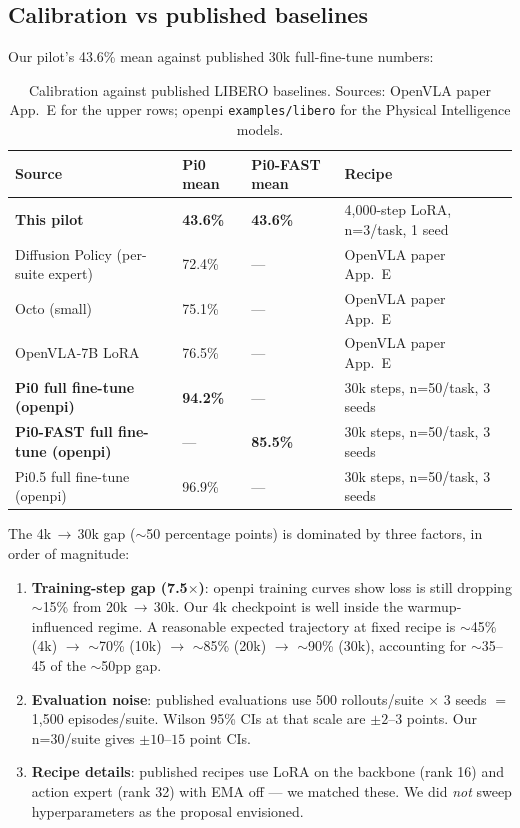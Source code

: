 \documentclass[11pt,letterpaper]{article}
\begin{document}
\subsection{Calibration vs published baselines}

Our pilot's 43.6\% mean against published 30k full-fine-tune numbers:

\begin{table}[h]
\centering
\small
\caption{Calibration against published LIBERO baselines. Sources: OpenVLA paper App.~E for the upper rows; openpi \texttt{examples/libero} for the Physical Intelligence models.}
\begin{tabularx}{\textwidth}{Xllll}
\toprule
\textbf{Source} & \textbf{Pi0 mean} & \textbf{Pi0-FAST mean} & \textbf{Recipe} \\
\midrule
\textbf{This pilot} & \textbf{43.6\%} & \textbf{43.6\%} & 4{,}000-step LoRA, n=3/task, 1 seed \\
Diffusion Policy (per-suite expert) & 72.4\% & --- & OpenVLA paper App.~E \\
Octo (small) & 75.1\% & --- & OpenVLA paper App.~E \\
OpenVLA-7B LoRA & 76.5\% & --- & OpenVLA paper App.~E \\
\textbf{Pi0 full fine-tune (openpi)} & \textbf{94.2\%} & --- & 30k steps, n=50/task, 3 seeds \\
\textbf{Pi0-FAST full fine-tune (openpi)} & --- & \textbf{85.5\%} & 30k steps, n=50/task, 3 seeds \\
Pi0.5 full fine-tune (openpi) & 96.9\% & --- & 30k steps, n=50/task, 3 seeds \\
\bottomrule
\end{tabularx}
\end{table}

The 4k\,$\to$\,30k gap ($\sim$50 percentage points) is dominated by three factors, in order of magnitude:

\begin{enumerate}[noitemsep,topsep=2pt]
  \item \textbf{Training-step gap (7.5$\times$)}: openpi training curves show loss is still dropping $\sim$15\% from 20k\,$\to$\,30k. Our 4k checkpoint is well inside the warmup-influenced regime. A reasonable expected trajectory at fixed recipe is $\sim$45\% (4k) $\to$ $\sim$70\% (10k) $\to$ $\sim$85\% (20k) $\to$ $\sim$90\% (30k), accounting for $\sim$35--45 of the $\sim$50pp gap.
  \item \textbf{Evaluation noise}: published evaluations use 500 rollouts/suite $\times$ 3 seeds $=$ 1{,}500 episodes/suite. Wilson 95\% CIs at that scale are $\pm 2$--$3$ points. Our n=30/suite gives $\pm 10$--$15$ point CIs.
  \item \textbf{Recipe details}: published recipes use LoRA on the backbone (rank 16) and action expert (rank 32) with EMA off --- we matched these. We did \emph{not} sweep hyperparameters as the proposal envisioned.
\end{enumerate}
\end{document}
